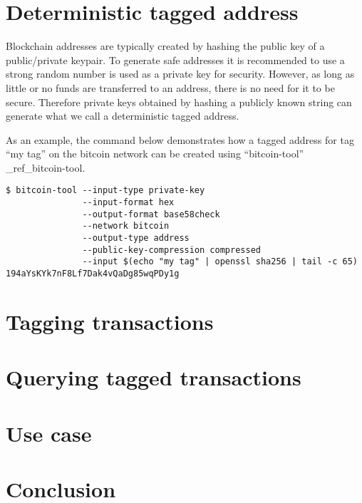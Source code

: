 \documentclass[a4paper,10pt]{article}
\begin{document}
\section{Deterministic tagged address}
Blockchain addresses are typically created by hashing the public key of a public/private keypair.
To generate safe addresses it is recommended to use a strong random number is used as a private key for security.
However, as long as little or no funds are transferred to an address, there is no need for it to be secure.
Therefore private keys obtained by hashing a publicly known string can generate what we call a deterministic tagged address.

As an example, the command below demonstrates how a tagged address for tag ``my tag'' on the bitcoin network can be created using ``bitcoin-tool'' \_ref\_bitcoin-tool.
\begin{verbatim}
$ bitcoin-tool --input-type private-key
               --input-format hex
               --output-format base58check
               --network bitcoin
               --output-type address
               --public-key-compression compressed
               --input $(echo "my tag" | openssl sha256 | tail -c 65)
194aYsKYk7nF8Lf7Dak4vQaDg85wqPDy1g
\end{verbatim}

\section{Tagging transactions}

\section{Querying tagged transactions}

\section{Use case}

\section{Conclusion}
\end{document}
